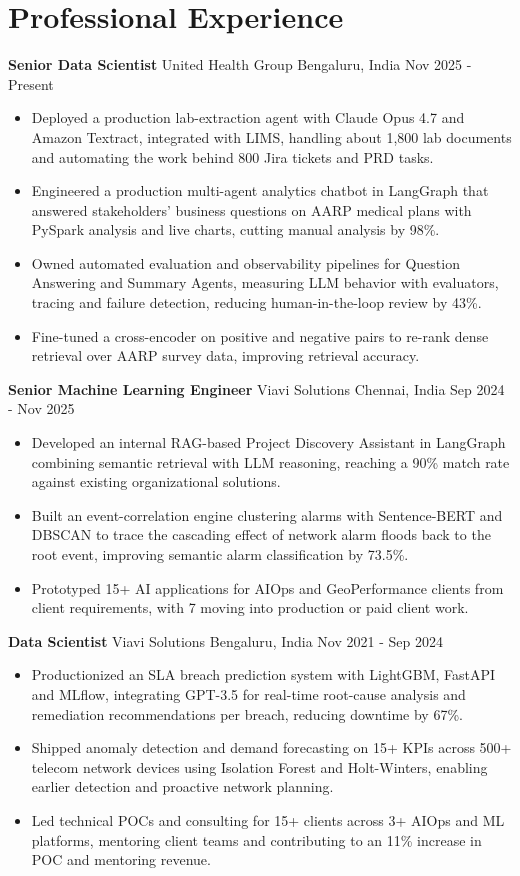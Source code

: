 \documentclass[10pt,a4paper]{article}
\newcommand{\role}[4]{\textbf{#1} \textbar{} #2 \hfill #3 \textbar{} #4\par}
\begin{document}
\section{Professional Experience}
\role{Senior Data Scientist}{United Health Group}{Bengaluru, India}{Nov 2025 - Present}
\begin{itemize}
  \item Deployed a production lab-extraction agent with Claude Opus 4.7 and Amazon Textract, integrated with LIMS, handling about 1,800 lab documents and automating the work behind 800 Jira tickets and PRD tasks.
  \item Engineered a production multi-agent analytics chatbot in LangGraph that answered stakeholders' business questions on AARP medical plans with PySpark analysis and live charts, cutting manual analysis by 98\%.
  \item Owned automated evaluation and observability pipelines for Question Answering and Summary Agents, measuring LLM behavior with evaluators, tracing and failure detection, reducing human-in-the-loop review by 43\%.
  \item Fine-tuned a cross-encoder on positive and negative pairs to re-rank dense retrieval over AARP survey data, improving retrieval accuracy.
\end{itemize}
\vspace{3pt}
\role{Senior Machine Learning Engineer}{Viavi Solutions}{Chennai, India}{Sep 2024 - Nov 2025}
\begin{itemize}
  \item Developed an internal RAG-based Project Discovery Assistant in LangGraph combining semantic retrieval with LLM reasoning, reaching a 90\% match rate against existing organizational solutions.
  \item Built an event-correlation engine clustering alarms with Sentence-BERT and DBSCAN to trace the cascading effect of network alarm floods back to the root event, improving semantic alarm classification by 73.5\%.
  \item Prototyped 15+ AI applications for AIOps and GeoPerformance clients from client requirements, with 7 moving into production or paid client work.
\end{itemize}
\vspace{3pt}
\role{Data Scientist}{Viavi Solutions}{Bengaluru, India}{Nov 2021 - Sep 2024}
\begin{itemize}
  \item Productionized an SLA breach prediction system with LightGBM, FastAPI and MLflow, integrating GPT-3.5 for real-time root-cause analysis and remediation recommendations per breach, reducing downtime by 67\%.
  \item Shipped anomaly detection and demand forecasting on 15+ KPIs across 500+ telecom network devices using Isolation Forest and Holt-Winters, enabling earlier detection and proactive network planning.
  \item Led technical POCs and consulting for 15+ clients across 3+ AIOps and ML platforms, mentoring client teams and contributing to an 11\% increase in POC and mentoring revenue.
\end{itemize}
\end{document}
